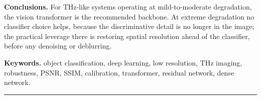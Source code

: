 \noindent\textbf{Conclusions.}\quad
For THz-like systems operating at mild-to-moderate degradation, the vision
transformer is the recommended backbone. At extreme degradation no classifier
choice helps, because the discriminative detail is no longer in the image; the
practical leverage there is restoring spatial resolution ahead of the
classifier, before any denoising or deblurring.

\noindent\textbf{Keywords.}\quad
object classification, deep learning, low resolution, THz imaging,
robustness, PSNR, SSIM, calibration, transformer, residual network,
dense network.

\bigskip
\hrule
\bigskip

\begin{hebrew}

\end{hebrew}
